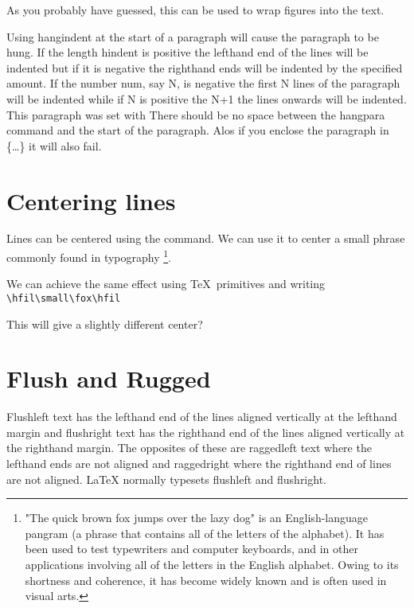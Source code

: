 As you probably have guessed, this can be used to wrap figures into the text.

Using hangindent at the start of a paragraph will cause the paragraph to be hung.
If the length hindent is positive the lefthand end of the lines will be indented but
if it is negative the righthand ends will be indented by the specified amount. If the
number num, say N, is negative the first N lines of the paragraph will be indented while
if N is positive the N+1 the lines onwards will be indented. This paragraph was set with
There should be no space between the hangpara command and
the start of the paragraph. Alos if you enclose the paragraph in \{\ldots\} it will also fail.

\section{Centering lines}
Lines can be centered using the  command. We can use it to center a small phrase commonly found
in typography \footnote{"The quick brown fox jumps over the lazy dog" is an English-language pangram (a phrase that contains all of the letters of the alphabet). It has been used to test typewriters and computer keyboards, and in other applications involving all of the letters in the English alphabet. Owing to its shortness and coherence, it has become widely known and is often used in visual arts.}.

\noindent\centerline{\small\fox}

We can achieve the same effect using \TeX\  primitives  and writing \verb+\hfil\small\fox\hfil+
\medskip

{\hfil\small\fox\hfil}


This will give a slightly different center?

\section{Flush and Rugged}

Flushleft text has the lefthand end of the lines aligned vertically at the lefthand margin
and flushright text has the righthand end of the lines aligned vertically at the righthand
margin. The opposites of these are raggedleft text where the lefthand ends are not aligned
and raggedright where the righthand end of lines are not aligned. LaTeX normally typesets
flushleft and flushright.

\topline

